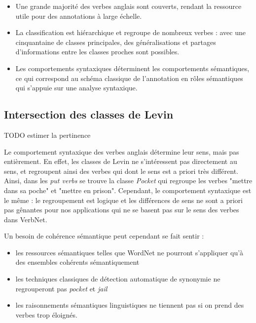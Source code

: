 \begin{itemize}

    \item Une grande majorité des verbes anglais sont couverts, rendant la
        ressource utile pour des annotations à large échelle.

    \item La classification est hiérarchique et regroupe de nombreux verbes :
        avec une cinquantaine de classes principales, des généralisations et
        partages d'informations entre les classes proches sont possibles.

    \item Les comportements syntaxiques déterminent les comportements
        sémantiques, ce qui correspond au schéma classique de l'annotation en
        rôles sémantiques qui s'appuie sur une analyse syntaxique.

\end{itemize}

\subsection{Intersection des classes de Levin}

TODO estimer la pertinence

Le comportement syntaxique des verbes anglais détermine leur sens, mais pas
entièrement. En effet, les classes de Levin ne s'intéressent pas directement au
sens, et regroupent ainsi des verbes qui dont le sens est a priori très
différent. Ainsi, dans les \textit{put verbs} se trouve la classe
\textit{Pocket} qui regroupe les verbes "mettre dans sa poche" et "mettre en
prison". Cependant, le comportement syntaxique est le même : le regroupement
est logique et les différences de sens ne sont a priori pas gênantes pour nos
applications qui ne se basent pas sur le sens des verbes dans VerbNet.

Un besoin de cohérence sémantique peut cependant se fait sentir :

\begin{itemize}

    \item les ressources sémantiques telles que WordNet ne pourront s'appliquer
        qu'à des ensembles cohérents sémantiquement

    \item les techniques classiques de détection automatique de synonymie ne
        regrouperont pas \textit{pocket} et \textit{jail}

    \item les raisonnements sémantiques linguistiques ne tiennent pas si on
        prend des verbes trop éloignés.

\end{itemize}

